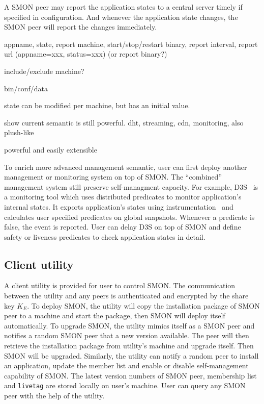 A SMON peer may report the application states to a central
server timely if specified in configuration. And whenever
the application state changes, the SMON peer will report the
changes immediately.


appname, state, report machine, start/stop/restart binary,
report interval, report url (appname=xxx, status=xxx) (or
report binary?)

include/exclude machine?

bin/conf/data

state can be modified per machine, but has an initial value.

show current semantic is still powerful. dht, streaming,
cdn, monitoring, also plush-like

powerful and easily extensible

To enrich more advanced management semantic, user can first
deploy another management or monitoring system on top of
SMON. The ``combined'' management system still preserve
self-managment capacity. For example, D3S~\cite{Liu2008} is
a monitoring tool which uses distributed predicates to
monitor application's internal states. It exports
application's states using instrumentation~\cite{Guo2008}
and calculates user specified predicates on global
snapshots. Whenever a predicate is false, the event is
reported. User can delay D3S on top of SMON and define
safety or liveness predicates to check application states in
detail.

\subsection{Client utility}
\label{subsec:client}

A client utility is provided for user to control SMON. The
communication between the utility and any peers is
authenticated and encrypted by the share key $K_E$. To
deploy SMON, the utility will copy the installation package
of SMON peer to a machine and start the package, then SMON
will deploy itself automatically. To upgrade SMON, the
utility mimics itself as a SMON peer and notifies a random
SMON peer that a new version available.  The peer will then
retrieve the installation package from utility's machine and
upgrade itself. Then SMON will be upgraded.  Similarly, the
utility can notify a random peer to install an application,
update the member list and enable or disable self-management
capability of SMON. The latest version numbers of SMON peer,
membership list and \texttt{livetag} are stored locally on
user's machine.  User can query any SMON peer with the help
of the utility.

